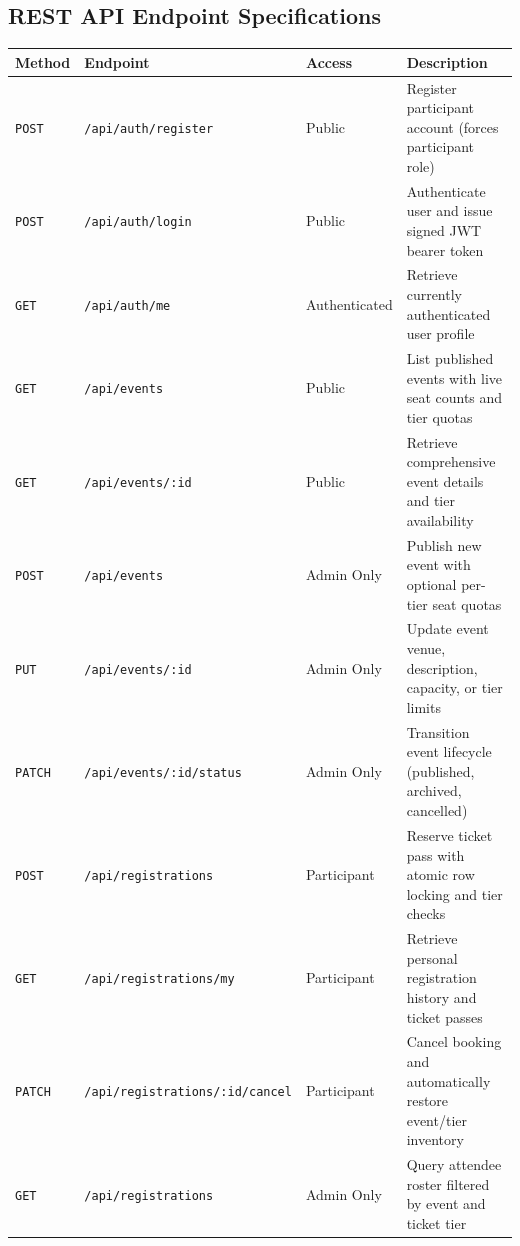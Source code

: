 \documentclass[11pt,a4paper]{article}
\begin{document}
\vspace{0.15in}
\subsection*{REST API Endpoint Specifications}
\begingroup
\fontsize{8.5}{11}\selectfont
\renewcommand{\arraystretch}{1.3}
\setlength{\tabcolsep}{3pt}

\noindent
\begin{tabularx}{\textwidth}{|p{}|p{}|p{}|X|}
\hline
\rowcolor{TCSBlue}
\color{white}\bfseries Method & 
\color{white}\bfseries Endpoint & 
\color{white}\bfseries Access & 
\color{white}\bfseries Description \\
\hline
\texttt{POST} & \texttt{/api/auth/register} & Public & Register participant account (forces participant role) \\
\hline
\texttt{POST} & \texttt{/api/auth/login} & Public & Authenticate user and issue signed JWT bearer token \\
\hline
\texttt{GET} & \texttt{/api/auth/me} & Authenticated & Retrieve currently authenticated user profile \\
\hline
\texttt{GET} & \texttt{/api/events} & Public & List published events with live seat counts and tier quotas \\
\hline
\texttt{GET} & \texttt{/api/events/:id} & Public & Retrieve comprehensive event details and tier availability \\
\hline
\texttt{POST} & \texttt{/api/events} & Admin Only & Publish new event with optional per-tier seat quotas \\
\hline
\texttt{PUT} & \texttt{/api/events/:id} & Admin Only & Update event venue, description, capacity, or tier limits \\
\hline
\texttt{PATCH} & \texttt{/api/events/:id/status} & Admin Only & Transition event lifecycle (published, archived, cancelled) \\
\hline
\texttt{POST} & \texttt{/api/registrations} & Participant & Reserve ticket pass with atomic row locking and tier checks \\
\hline
\texttt{GET} & \texttt{/api/registrations/my} & Participant & Retrieve personal registration history and ticket passes \\
\hline
\texttt{PATCH} & \texttt{/api/registrations/:id/cancel} & Participant & Cancel booking and automatically restore event/tier inventory \\
\hline
\texttt{GET} & \texttt{/api/registrations} & Admin Only & Query attendee roster filtered by event and ticket tier \\

\end{tabularx}
\end{document}
